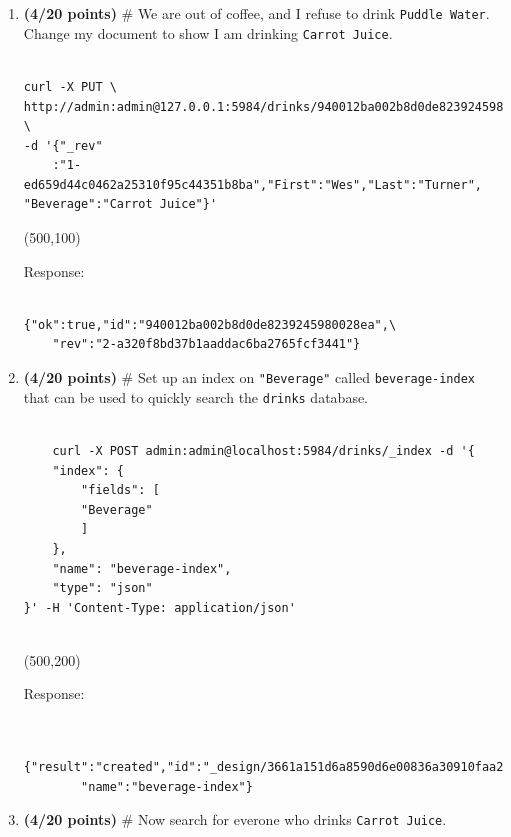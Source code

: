 \documentclass[10pt]{article}
\begin{document}
\begin{enumerate}
\begin{enumerate}
	\item \textbf{(4/20 points)} \# We are out of coffee, and I refuse to drink \verb|Puddle Water|. Change my document to show I am drinking \verb|Carrot Juice|. 

\beginanswers	
\begin{lstlisting}

curl -X PUT \ http://admin:admin@127.0.0.1:5984/drinks/940012ba002b8d0de8239245980028ea \
-d '{"_rev"
	:"1-ed659d44c0462a25310f95c44351b8ba","First":"Wes","Last":"Turner", "Beverage":"Carrot Juice"}'

\end{lstlisting}
\else


\hspace*{-0.4in}\framebox(500,100){}


\fi
Response:
\begin{lstlisting}

{"ok":true,"id":"940012ba002b8d0de8239245980028ea",\
	"rev":"2-a320f8bd37b1aaddac6ba2765fcf3441"}

\end{lstlisting}

\newpage

	\item \textbf{(4/20 points)} \# Set up an index on \verb*|"Beverage"| called \verb*|beverage-index| that can be used to quickly search the \verb*|drinks| database.

\beginanswers	
\begin{lstlisting}
	
	curl -X POST admin:admin@localhost:5984/drinks/_index -d '{
	"index": {
		"fields": [
		"Beverage"
		]
	},
	"name": "beverage-index",
	"type": "json"
}' -H 'Content-Type: application/json'
	
\end{lstlisting}
\else


\hspace*{-0.4in}\framebox(500,200){}


\fi
Response:
\begin{lstlisting}
	
	{"result":"created","id":"_design/3661a151d6a8590d6e00836a30910faa25247eaf",\
		"name":"beverage-index"}

\end{lstlisting}
	\item \textbf{(4/20 points)} \# Now search for everone who drinks \verb|Carrot Juice|.

\beginanswers	
\begin{lstlisting}


\end{lstlisting}
\end{enumerate}
\end{enumerate}
\end{document}
